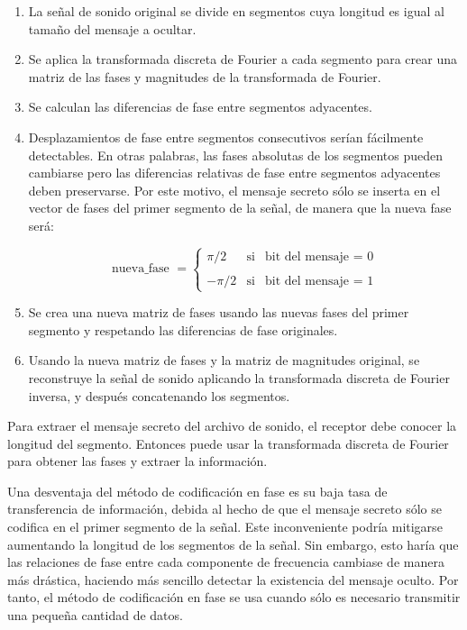 \documentclass[12pt]{article}
\begin{document}
\begin{enumerate}

\item La señal de sonido original se divide en segmentos cuya longitud es igual al tamaño del mensaje a ocultar.

\item Se aplica la transformada discreta de Fourier a cada segmento para crear una matriz de las fases y magnitudes de la transformada de Fourier.

\item Se calculan las diferencias de fase entre segmentos adyacentes.

\item Desplazamientos de fase entre segmentos consecutivos serían fácilmente detectables. En otras palabras, las fases absolutas de los segmentos pueden cambiarse pero las diferencias relativas de fase entre segmentos adyacentes deben preservarse. Por este motivo, el mensaje secreto sólo se inserta en el vector de fases del primer segmento de la señal, de manera que la nueva fase será:

\[
\text{nueva\_fase }=\left\{
\begin{array}{ccc}
\pi /2 & \text{si} & \text{bit del mensaje = 0} \\
&  &  \\
-\pi /2 & \text{si} & \text{bit del mensaje = 1}
\end{array}
\right.
\]

\item Se crea una nueva matriz de fases usando las nuevas fases del primer segmento y respetando las diferencias de fase originales.

\item Usando la nueva matriz de fases y la matriz de magnitudes original, se reconstruye la señal de sonido aplicando la transformada discreta de Fourier inversa, y después concatenando los segmentos.

\end{enumerate}

Para extraer el mensaje secreto del archivo de sonido, el receptor debe conocer la longitud del segmento. Entonces puede usar la transformada discreta de Fourier para obtener las fases y extraer la información.

\medskip

Una desventaja del método de codificación en fase es su baja tasa de transferencia de información, debida al hecho de que el mensaje secreto sólo se codifica en el primer segmento de la señal. Este inconveniente podría mitigarse aumentando la longitud de los segmentos de la señal. Sin embargo, esto haría que las relaciones de fase entre cada componente de frecuencia cambiase de manera más drástica, haciendo más sencillo detectar la existencia del mensaje oculto. Por tanto, el método de codificación en fase se usa cuando sólo es necesario transmitir una pequeña cantidad de datos.
\end{document}
